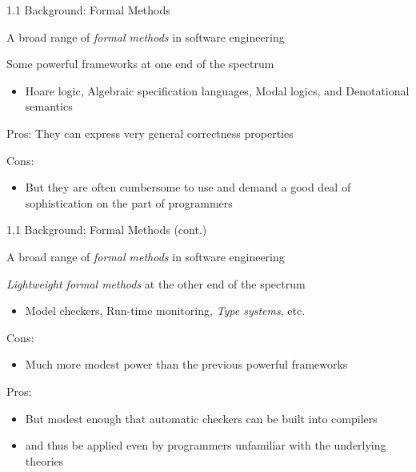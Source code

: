 \documentclass[table]{beamer}
\begin{document}
\begin{frame}[t]{1.1 Background: Formal Methods} \vspace{10pt}


A broad range of {\it formal methods } in software engineering

\vspace{10pt}

Some powerful frameworks at one end of the spectrum

\begin{itemize}

\item  Hoare logic, Algebraic specification languages, Modal logics, and Denotational semantics

\end{itemize}

\vspace{10pt}

Pros: They can express very general correctness properties 

\vspace{10pt}

Cons: 
\begin{itemize}
\item But they are often cumbersome to use and demand a good deal of sophistication on the part of programmers
\end{itemize}

\end{frame}

\begin{frame}[t]{1.1 Background: Formal Methods (cont.)} \vspace{10pt}

A broad range of {\it formal methods } in software engineering 

\vspace{10pt}

{\it Lightweight formal methods} at the other end of the spectrum
\begin{itemize}
\item Model checkers, Run-time monitoring, {\it Type systems}, etc.
\end{itemize}

\vspace{10pt}

Cons: 
\begin{itemize}
\item Much more modest power than the previous powerful frameworks
\end{itemize}

\vspace{10pt}

Pros: 
\begin{itemize}
\item But modest enough that automatic checkers can be built into compilers  
\item and thus be applied even by programmers unfamiliar with the underlying theories
\end{itemize}

\end{frame}
\end{document}
